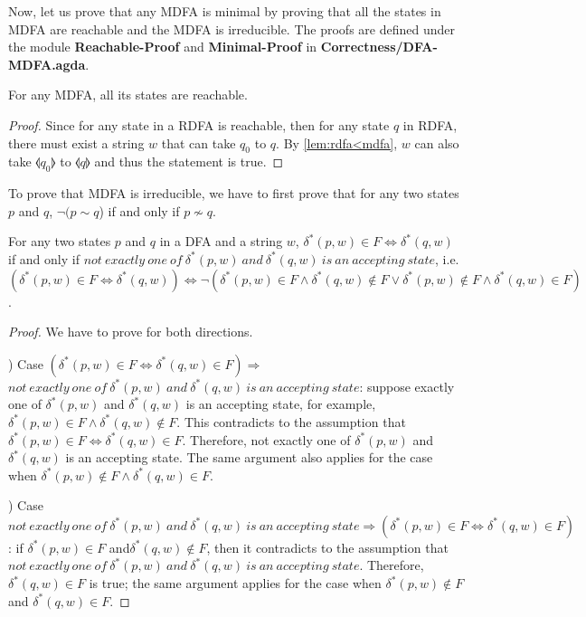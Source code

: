 \par Now, let us prove that any MDFA is minimal by proving that all the states in MDFA are reachable and the MDFA
is irreducible. The proofs are defined under the module
\textbf{Reachable-Proof} and \textbf{Minimal-Proof} in
\textbf{Correctness/DFA-MDFA.agda}. 

\begin{thm}
\label{thm:all_reach}
\noindent For any MDFA, all its states are reachable. 
\end{thm}

\begin{proof}
\noindent Since for any state in a RDFA is reachable, then for any
state \(q\) in RDFA, there must
exist a string \(w\) that can take \(q_0\) to \(q\). By
\autoref{lem:rdfa<mdfa}, \(w\) can also take \(\llangle q_0
\rrangle\) to \(\llangle q \rrangle\) and thus the statement is true. 
\end{proof}

\par To prove that MDFA is irreducible, we have to first prove
that for any two states \(p\) and \(q\), \(\neg (p \sim q\)) if and only if
\(p \nsim q\). 

\begin{lem}
\label{lem:sim_nsim1}
\noindent For any two states \(p\) and \(q\) in a DFA and a string
\(w\), \(\delta^*(p,w) \in F \Leftrightarrow \delta^*(q,w)\) if and
only if \(not\ exactly\ one\ of\ \delta^*(p,w)\ and\ \delta^*(q,w)\
is\ an\ accepting\ state\), i.e. \((\delta^*(p,w) \in F \Leftrightarrow
\delta^*(q,w)) \Leftrightarrow \neg (\delta^*(p,w) \in F \wedge \delta^*(q,w) \notin F \vee
\delta^*(p,w) \notin F \wedge \delta^*(q,w) \in F)\). 
\end{lem}

\begin{proof}
\noindent We have to prove for both directions. 

\par {}) Case \((\delta^*(p,w) \in F \Leftrightarrow
\delta^*(q,w) \in F) \Rightarrow\) \(not\ 
exactly\ one\ of\ \delta^*(p,w)\ and\ \delta^*(q,w)\ is\ 
an\ accepting\ state\): suppose exactly one of \(\delta^*(p,w)\) and
\(\delta^*(q,w)\) is an accepting state, for example, \(\delta^*(p,w)
\in F \wedge \delta^*(q,w) \notin F\). This contradicts to the
assumption that \(\delta^*(p,w) \in F \Leftrightarrow \delta^*(q,w) \in F\). Therefore, not
exactly one of \(\delta^*(p,w)\) and \(\delta^*(q,w)\) is
an accepting state. The same argument also applies for the case when \(\delta^*(p,w)
\notin F \wedge \delta^*(q,w) \in F\).

\par \noindent 2) Case \(not\ 
exactly\ one\ of\ \delta^*(p,w)\ and\ \delta^*(q,w)\ is\ 
an\ accepting\ state \Rightarrow (\delta^*(p,w) \in F \Leftrightarrow
\delta^*(q,w) \in F)\): if \(\delta^*(p,w) \in F\) and\(\delta^*(q,w) \notin
F\), then it contradicts to the assumption that \(not\ 
exactly\ one\ of\ \delta^*(p,w)\ and\ \delta^*(q,w)\ is\ 
an\ accepting\ state\). Therefore, \(\delta^*(q,w) \in F\) is true;
the same argument applies for the case when \(\delta^*(p,w) \notin F\)
and \(\delta^*(q,w) \in F\).
\end{proof}


